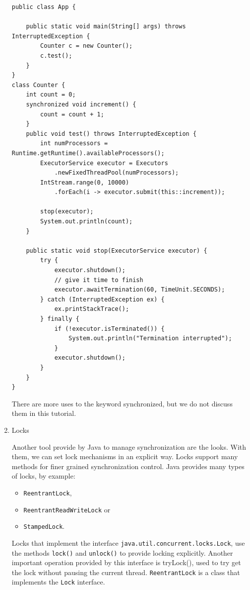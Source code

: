 \documentclass{latex/classes/thesis}
\begin{document}
\begin{enumerate}
\begin{lstlisting}
public class App {

    public static void main(String[] args) throws InterruptedException {
        Counter c = new Counter();
        c.test();
    }
}
class Counter {
    int count = 0;
    synchronized void increment() {
        count = count + 1;
    }
    public void test() throws InterruptedException {
        int numProcessors = Runtime.getRuntime().availableProcessors();
        ExecutorService executor = Executors
            .newFixedThreadPool(numProcessors);
        IntStream.range(0, 10000)
            .forEach(i -> executor.submit(this::increment));

        stop(executor);
        System.out.println(count);
    }

    public static void stop(ExecutorService executor) {
        try {
            executor.shutdown();
            // give it time to finish
            executor.awaitTermination(60, TimeUnit.SECONDS);
        } catch (InterruptedException ex) {
            ex.printStackTrace();
        } finally {
            if (!executor.isTerminated()) {
                System.out.println("Termination interrupted");
            }
            executor.shutdown();
        }
    }
}
\end{lstlisting}

There are more uses to the keyword synchronized, but we do not discuss them
in this tutorial.


\item Locks
\label{sec:org061499b}


Another tool provide by Java to manage synchronization are the looks. With
them, we can set lock mechanisms in an explicit way. Locks support many
methods for finer grained synchronization control. Java provides many types
of locks, by  example:
\begin{itemize}
\item \texttt{ReentrantLock},
\item \texttt{ReentrantReadWriteLock} or
\item \texttt{StampedLock}.
\end{itemize}

Locks that implement the interface \texttt{java.util.concurrent.locks.Lock}, use the
methods \texttt{lock()} and \texttt{unlock()} to provide locking explicitly. Another important
operation provided by this interface is tryLock(), used to try get the lock
without pausing the current thread. \texttt{ReentrantLock} is a class that implements
the \texttt{Lock} interface.


\end{enumerate}
\end{document}
